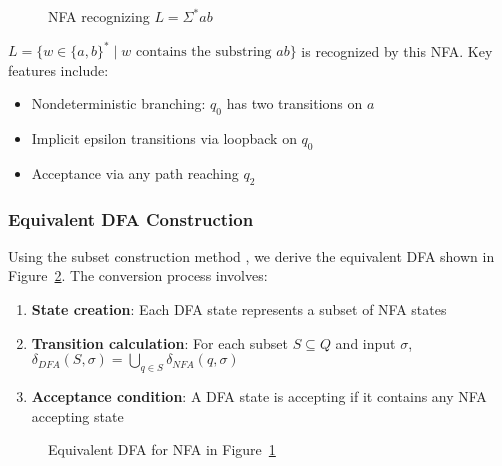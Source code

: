 \begin{figure}[h]
    \centering  
    \caption{NFA recognizing \( L = \Sigma^*ab \)}
    \label{fig:nfa-example}
\end{figure}

\(
L = \{ w \in \{a, b\}^* \mid w \text{ contains the substring } ab \}
\) is recognized by this NFA. Key features include:
\begin{itemize}
    \item Nondeterministic branching: \( q_0 \) has two transitions on \( a \)
    \item Implicit epsilon transitions via loopback on \( q_0 \)
    \item Acceptance via any path reaching \( q_2 \)
\end{itemize}

\subsubsection{Equivalent DFA Construction}
Using the subset construction method \cite{hopcroft2006introduction}, we derive the equivalent DFA shown in Figure~\ref{fig:dfa-conversion}. The conversion process involves:
\begin{enumerate}
    \item \textbf{State creation}: Each DFA state represents a subset of NFA states
    \item \textbf{Transition calculation}: For each subset \( S \subseteq Q \) and input \( \sigma \), \( \delta_{DFA}(S, \sigma) = \bigcup_{q \in S} \delta_{NFA}(q, \sigma) \)
    \item \textbf{Acceptance condition}: A DFA state is accepting if it contains any NFA accepting state \cite{GeeksforGeeksDFA2024}
\end{enumerate}

\begin{figure}[h]
    \centering  
    \caption{Equivalent DFA for NFA in Figure~\ref{fig:nfa-example} \cite{hopcroft2006introduction}}
    \label{fig:dfa-conversion}
\end{figure}

